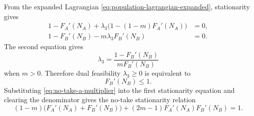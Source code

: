 \documentclass{article}
\numberwithin{equation}{section}
\begin{document}
From the expanded Lagrangian
\eqref{eq:population-lagrangian-expanded}, stationarity gives
\begin{equation}
    \label{eq:no-take-a-kkt-stationarity}
    \begin{aligned}
    1-F_A'(N_A)
    +\lambda_3\bigl(1-(1-m)F_A'(N_A)\bigr)&=0,\\
    1-F_B'(N_B)-m\lambda_3F_B'(N_B)&=0.
    \end{aligned}
\end{equation}
The second equation gives
\begin{equation}
    \label{eq:no-take-a-multiplier}
    \lambda_3=\frac{1-F_B'(N_B)}{mF_B'(N_B)}
\end{equation}
when $m>0$. Therefore dual feasibility $\lambda_3\geq0$ is equivalent to
\begin{equation}
    \label{eq:no-take-a-dual-feasibility}
    F_B'(N_B)\leq1.
\end{equation}
Substituting \eqref{eq:no-take-a-multiplier} into the first
stationarity equation and clearing the denominator gives the no-take
stationarity relation
\begin{equation}
    \label{eq:no-take-stationarity-derivatives}
    (1-m)\bigl(F_A'(N_A)+F_B'(N_B)\bigr)
    +(2m-1)F_A'(N_A)F_B'(N_B)=1.
\end{equation}
\end{document}
